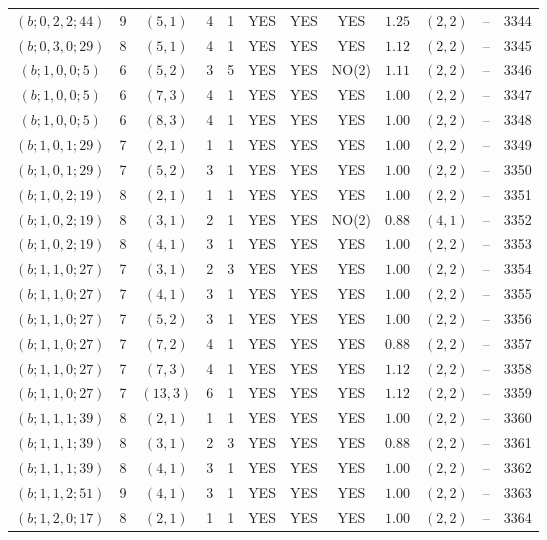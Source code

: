 \begin{longtable}{|c|c|c|c|c|c|c|c|c|c|c|c|}
$(b;0,2,2;44)$ & 9 & $(5,1)$ & 4 & 1 & YES & YES & YES & $1.25$ & $(2,2)$ & -- & 3344\\
$(b;0,3,0;29)$ & 8 & $(5,1)$ & 4 & 1 & YES & YES & YES & $1.12$ & $(2,2)$ & -- & 3345\\
$(b;1,0,0;5)$ & 6 & $(5,2)$ & 3 & 5 & YES & YES & NO(2) & $1.11$ & $(2,2)$ & -- & 3346\\
$(b;1,0,0;5)$ & 6 & $(7,3)$ & 4 & 1 & YES & YES & YES & $1.00$ & $(2,2)$ & -- & 3347\\
$(b;1,0,0;5)$ & 6 & $(8,3)$ & 4 & 1 & YES & YES & YES & $1.00$ & $(2,2)$ & -- & 3348\\
$(b;1,0,1;29)$ & 7 & $(2,1)$ & 1 & 1 & YES & YES & YES & $1.00$ & $(2,2)$ & -- & 3349\\
$(b;1,0,1;29)$ & 7 & $(5,2)$ & 3 & 1 & YES & YES & YES & $1.00$ & $(2,2)$ & -- & 3350\\
$(b;1,0,2;19)$ & 8 & $(2,1)$ & 1 & 1 & YES & YES & YES & $1.00$ & $(2,2)$ & -- & 3351\\
$(b;1,0,2;19)$ & 8 & $(3,1)$ & 2 & 1 & YES & YES & NO(2) & $0.88$ & $(4,1)$ & -- & 3352\\
$(b;1,0,2;19)$ & 8 & $(4,1)$ & 3 & 1 & YES & YES & YES & $1.00$ & $(2,2)$ & -- & 3353\\
$(b;1,1,0;27)$ & 7 & $(3,1)$ & 2 & 3 & YES & YES & YES & $1.00$ & $(2,2)$ & -- & 3354\\
$(b;1,1,0;27)$ & 7 & $(4,1)$ & 3 & 1 & YES & YES & YES & $1.00$ & $(2,2)$ & -- & 3355\\
$(b;1,1,0;27)$ & 7 & $(5,2)$ & 3 & 1 & YES & YES & YES & $1.00$ & $(2,2)$ & -- & 3356\\
$(b;1,1,0;27)$ & 7 & $(7,2)$ & 4 & 1 & YES & YES & YES & $0.88$ & $(2,2)$ & -- & 3357\\
$(b;1,1,0;27)$ & 7 & $(7,3)$ & 4 & 1 & YES & YES & YES & $1.12$ & $(2,2)$ & -- & 3358\\
$(b;1,1,0;27)$ & 7 & $(13,3)$ & 6 & 1 & YES & YES & YES & $1.12$ & $(2,2)$ & -- & 3359\\
$(b;1,1,1;39)$ & 8 & $(2,1)$ & 1 & 1 & YES & YES & YES & $1.00$ & $(2,2)$ & -- & 3360\\
$(b;1,1,1;39)$ & 8 & $(3,1)$ & 2 & 3 & YES & YES & YES & $0.88$ & $(2,2)$ & -- & 3361\\
$(b;1,1,1;39)$ & 8 & $(4,1)$ & 3 & 1 & YES & YES & YES & $1.00$ & $(2,2)$ & -- & 3362\\
$(b;1,1,2;51)$ & 9 & $(4,1)$ & 3 & 1 & YES & YES & YES & $1.00$ & $(2,2)$ & -- & 3363\\
$(b;1,2,0;17)$ & 8 & $(2,1)$ & 1 & 1 & YES & YES & YES & $1.00$ & $(2,2)$ & -- & 3364\\

\end{longtable}
